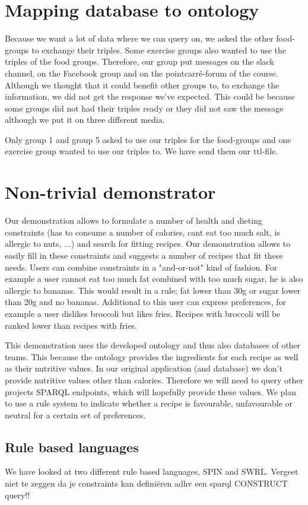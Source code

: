 \section{Mapping database to ontology}
Because we want a lot of data where we can query on, we asked the other food-groups to exchange their triples. Some exercise groups also wanted to use the triples of the food groups. Therefore, our group put messages on the slack channel, on the Facebook group and on the pointcarré-forum of the course. Although we thought that it could benefit other groups to, to exchange the information, we did not get the response we've expected. This could be because some groups did not had their triples ready or they did not saw the message although we put it on three different media.

Only group 1 and group 5 asked to use our triples for the food-groups and one exercise group wanted to use our triples to. We have send them our ttl-file. 
\section{Non-trivial demonstrator}
Our demonstration allows to formulate a number of health and dieting constraints (has to consume a number of calories, cant eat too much salt, is allergic to nuts, ...) and search for fitting recipes. Our demonstration allows to easily fill in these constraints and suggests a number of recipes that fit these needs. Users can combine constraints in a "and-or-not" kind of fashion. For example a user cannot eat too much fat combined with too much sugar, he is also allergic to bananas. This would result in a rule; fat lower than 30g or sugar lower than 20g and no bananas. Additional to this user can express preferences, for example a user dislikes broccoli but likes fries. Recipes with broccoli will be ranked lower than recipes with fries.

This demonstration uses the developed ontology and thus also databases of other teams. This because the ontology provides the ingredients for each recipe as well as their nutritive values. In our original application (and database) we don't provide nutritive values other than calories. Therefore we will need to query other projects SPARQL endpoints, which will hopefully provide these values. We plan to use a rule system to indicate whether a recipe is favourable, unfavourable or neutral for a certain set of preferences.
\subsection{Rule based languages}
We have looked at two different rule based languages, SPIN and SWRL. Vergeet niet te zeggen da je constraints kan definiëren adhv een sparql CONSTRUCT query!!

